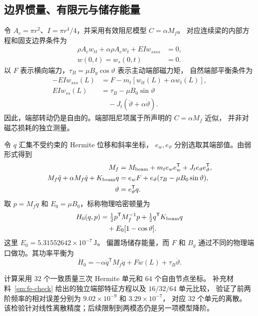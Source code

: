 \subsection{边界惯量、有限元与储存能量}
\label{mech:finite-elements}
令 $A_c=\pi r^2$、$I=\pi r^4/4$，并采用有效阻尼模型 $C=\alpha M_f$。
对应连续梁的内部方程和固支边界条件为
\begin{align}
 \rho A_cw_{tt}+\alpha\rho A_cw_t+EIw_{ssss}&=0,\nonumber\\
 w(0,t)=w_s(0,t)&=0.
 \label{mech:beam}
\end{align}
以 $F$ 表示横向端力，$\tau_B=\mu B_y\cos\vartheta$ 表示主动端部磁力矩，
自然端部平衡条件为
\begin{align}
 -EIw_{sss}(L)&=F-m_t[w_{tt}(L)+\alpha w_t(L)],\nonumber\\
 EIw_{ss}(L)&=\tau_B-\mu B_0\sin\vartheta\nonumber\\
 &\quad-J_t(\ddot\vartheta+\alpha\dot\vartheta).
 \label{mech:endpoint-balance}
\end{align}
因此，端部转动仍是自由的。端部阻尼项属于所声明的 $C=\alpha M_f$ 近似，
并非对磁芯损耗的独立测量。

令 $q$ 汇集不受约束的 Hermite 位移和斜率坐标，
$e_w,e_\vartheta$ 分别选取其端部值。由弱形式得到
\begin{align}
 M_f&=M_{\rm beam}+m_te_we_w^{\mathsf T}
                         +J_te_\vartheta e_\vartheta^{\mathsf T},\nonumber\\
 M_f\ddot q+\alpha M_f\dot q+K_{\rm beam}q
 &=e_wF+e_\vartheta(\tau_B-\mu B_0\sin\vartheta),\nonumber\\
 \vartheta&=e_\vartheta^{\mathsf T}q.
 \label{mech:fe-plant}
\end{align}
取 $p=M_f\dot q$ 和 $E_0=\mu B_0$，标称物理哈密顿量为
\begin{align}
 H_0(q,p)&=\tfrac12p^{\mathsf T}M_f^{-1}p
             +\tfrac12q^{\mathsf T}K_{\rm beam}q\nonumber\\
 &\quad+E_0[1-\cos\vartheta].
 \label{mech:fe-energy}
\end{align}
这里 $E_0=5.31552642\times10^{-7}\,\mathrm J$。
偏置场储存能量，而 $F$ 和 $B_y$ 通过不同的物理端口做功。其功率平衡为
\begin{equation}
 \dot H_0=-\alpha\dot q^{\mathsf T}M_f\dot q
              +F\dot w(L)+\tau_B\dot\vartheta.
 \label{mech:physical-power}
\end{equation}

计算采用 $32$ 个一致质量三次 Hermite 单元和 $64$ 个自由节点坐标。
补充材料~\ref{sm:fe-check} 给出的独立端部特征方程以及 $16/32/64$ 单元比较，
验证了前两阶频率的相对误差分别为 $9.02\times10^{-9}$ 和 $3.29\times10^{-7}$，
对应 $32$ 个单元的离散。
该检验针对线性离散精度；后续限制到两模态仍是另一项模型降阶。

